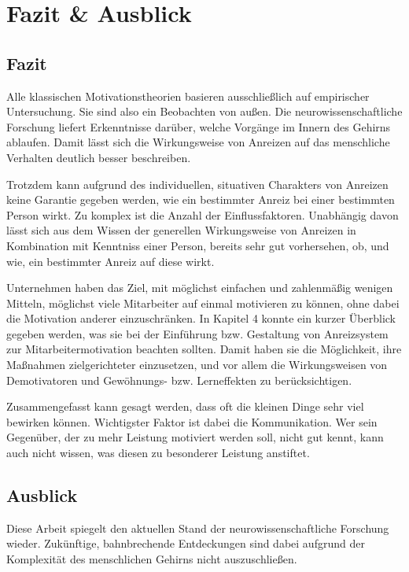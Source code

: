 \newpage
\section{Fazit \& Ausblick} %

\subsection*{Fazit}
Alle klassischen Motivationstheorien basieren ausschließlich auf empirischer Untersuchung. Sie sind also ein Beobachten von außen. Die neurowissenschaftliche Forschung liefert Erkenntnisse darüber, welche Vorgänge im Innern des Gehirns ablaufen. Damit lässt sich die Wirkungsweise von Anreizen auf das menschliche Verhalten deutlich besser beschreiben. 

Trotzdem kann aufgrund des individuellen, situativen Charakters von Anreizen keine Garantie gegeben werden, wie ein bestimmter Anreiz bei einer bestimmten Person wirkt. Zu komplex ist die Anzahl der Einflussfaktoren. Unabhängig davon lässt sich aus dem Wissen der generellen Wirkungsweise von Anreizen in Kombination mit Kenntniss einer Person, bereits sehr gut vorhersehen, ob, und wie, ein bestimmter Anreiz auf diese wirkt.

Unternehmen haben das Ziel, mit möglichst einfachen und zahlenmäßig wenigen Mitteln, möglichst viele Mitarbeiter auf einmal motivieren zu können, ohne dabei die Motivation anderer einzuschränken. In Kapitel 4 konnte ein kurzer Überblick gegeben werden, was sie bei der Einführung bzw. Gestaltung von Anreizsystem zur Mitarbeitermotivation beachten sollten. Damit haben sie die Möglichkeit, ihre Maßnahmen zielgerichteter einzusetzen, und vor allem die Wirkungsweisen von Demotivatoren und Gewöhnungs- bzw. Lerneffekten zu berücksichtigen.

Zusammengefasst kann gesagt werden, dass oft die kleinen Dinge sehr viel bewirken können. Wichtigster Faktor ist dabei die Kommunikation. Wer sein Gegenüber, der zu mehr Leistung motiviert werden soll, nicht gut kennt, kann auch nicht wissen, was diesen zu besonderer Leistung anstiftet.





\subsection*{Ausblick}
Diese Arbeit spiegelt den aktuellen Stand der neurowissenschaftliche Forschung wieder. Zukünftige, bahnbrechende Entdeckungen sind dabei aufgrund der Komplexität des menschlichen Gehirns nicht auszuschließen. 



